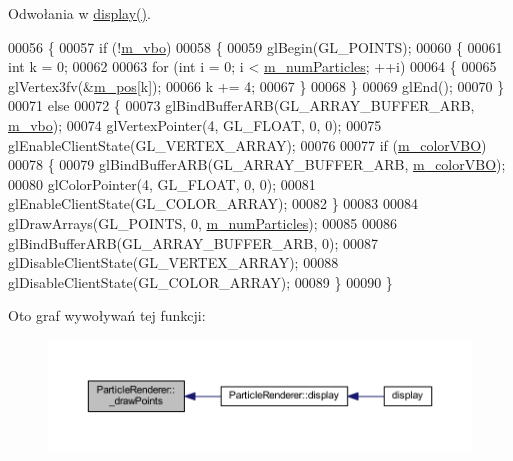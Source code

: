 Odwołania w \hyperlink{render__particles_8cpp_source_l00092}{display()}.


\begin{DoxyCode}
00056 \{
00057     \textcolor{keywordflow}{if} (!\hyperlink{class_particle_renderer_a7549feaa0982abbc44c9fe73f2eb251f}{m\_vbo})
00058     \{
00059         glBegin(GL\_POINTS);
00060         \{
00061             \textcolor{keywordtype}{int} k = 0;
00062 
00063             \textcolor{keywordflow}{for} (\textcolor{keywordtype}{int} i = 0; i < \hyperlink{class_particle_renderer_af885fdb5e6da925209dfd960f66b5fd8}{m\_numParticles}; ++i)
00064             \{
00065                 glVertex3fv(&\hyperlink{class_particle_renderer_a1d74720edb5c3a13edcdd176ac0d84c7}{m\_pos}[k]);
00066                 k += 4;
00067             \}
00068         \}
00069         glEnd();
00070     \}
00071     \textcolor{keywordflow}{else}
00072     \{
00073         glBindBufferARB(GL\_ARRAY\_BUFFER\_ARB, \hyperlink{class_particle_renderer_a7549feaa0982abbc44c9fe73f2eb251f}{m\_vbo});
00074         glVertexPointer(4, GL\_FLOAT, 0, 0);
00075         glEnableClientState(GL\_VERTEX\_ARRAY);
00076 
00077         \textcolor{keywordflow}{if} (\hyperlink{class_particle_renderer_a7dcaa73a41c598207974432206b423b5}{m\_colorVBO})
00078         \{
00079             glBindBufferARB(GL\_ARRAY\_BUFFER\_ARB, \hyperlink{class_particle_renderer_a7dcaa73a41c598207974432206b423b5}{m\_colorVBO});
00080             glColorPointer(4, GL\_FLOAT, 0, 0);
00081             glEnableClientState(GL\_COLOR\_ARRAY);
00082         \}
00083 
00084         glDrawArrays(GL\_POINTS, 0, \hyperlink{class_particle_renderer_af885fdb5e6da925209dfd960f66b5fd8}{m\_numParticles});
00085 
00086         glBindBufferARB(GL\_ARRAY\_BUFFER\_ARB, 0);
00087         glDisableClientState(GL\_VERTEX\_ARRAY);
00088         glDisableClientState(GL\_COLOR\_ARRAY);
00089     \}
00090 \}
\end{DoxyCode}


Oto graf wywoływań tej funkcji\-:\nopagebreak
\begin{figure}[H]
\begin{center}
\leavevmode
\includegraphics[width=350pt]{class_particle_renderer_a2683c43c010bff7973a977c1953f2bd6_icgraph}
\end{center}
\end{figure}



